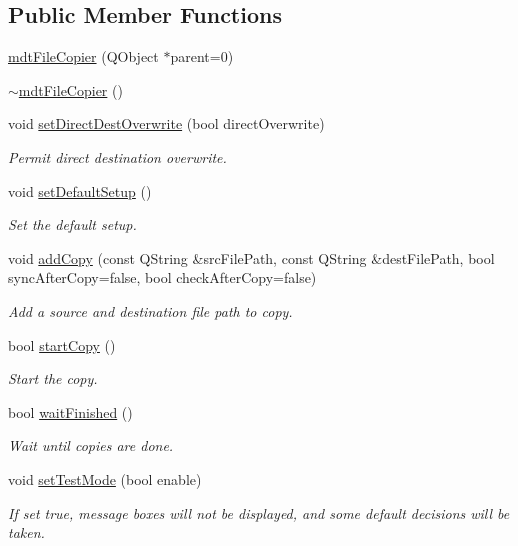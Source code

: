 \subsection*{Public Member Functions}
\begin{DoxyCompactItemize}
\item 
\hyperlink{classmdt_file_copier_a32fc7a1c4d796ce0f3781c24257a0a02}{mdt\-File\-Copier} (Q\-Object $\ast$parent=0)
\item 
\hyperlink{classmdt_file_copier_a818453c5591e4ec9c6de6adc67bc4e00}{$\sim$mdt\-File\-Copier} ()
\item 
void \hyperlink{classmdt_file_copier_ad045db0c7b84a7c9505d7ac1704f7413}{set\-Direct\-Dest\-Overwrite} (bool direct\-Overwrite)
\begin{DoxyCompactList}\small\item\em Permit direct destination overwrite. \end{DoxyCompactList}\item 
void \hyperlink{classmdt_file_copier_a868ce61ec7d8f590002dd350276413a4}{set\-Default\-Setup} ()
\begin{DoxyCompactList}\small\item\em Set the default setup. \end{DoxyCompactList}\item 
void \hyperlink{classmdt_file_copier_ad0730aae81b3ba64eec4563390b852a3}{add\-Copy} (const Q\-String \&src\-File\-Path, const Q\-String \&dest\-File\-Path, bool sync\-After\-Copy=false, bool check\-After\-Copy=false)
\begin{DoxyCompactList}\small\item\em Add a source and destination file path to copy. \end{DoxyCompactList}\item 
bool \hyperlink{classmdt_file_copier_acd5397fbea57f8169a5dddd2809d26cb}{start\-Copy} ()
\begin{DoxyCompactList}\small\item\em Start the copy. \end{DoxyCompactList}\item 
bool \hyperlink{classmdt_file_copier_adcfa582fe6e1e3420c8285c2301323f6}{wait\-Finished} ()
\begin{DoxyCompactList}\small\item\em Wait until copies are done. \end{DoxyCompactList}\item 
void \hyperlink{classmdt_file_copier_ad971d6b727c4ceaa1a39bf356d694654}{set\-Test\-Mode} (bool enable)
\begin{DoxyCompactList}\small\item\em If set true, message boxes will not be displayed, and some default decisions will be taken. \end{DoxyCompactList}\end{DoxyCompactItemize}


